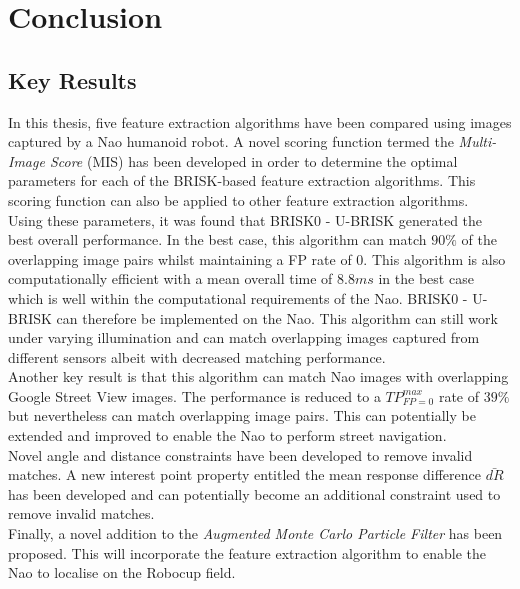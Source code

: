 \chapter{Conclusion}
\label{sec:Conclusion}



\section{Key Results}
\label{sec:keyResults}
In this thesis, five feature extraction algorithms have been compared using images captured by a Nao humanoid robot. A novel scoring function termed the \textit{Multi-Image Score} (MIS) has been developed in order to determine the optimal parameters for each  of the BRISK-based feature extraction algorithms. This scoring function can also be applied to other feature extraction algorithms.\\

Using these parameters, it was found that BRISK0 - U-BRISK generated the best overall performance. In the best case, this algorithm can match $90\%$ of the overlapping image pairs whilst maintaining a FP rate of $0$. This algorithm is also computationally efficient with a mean overall time of $8.8 ms$ in the best case which is well within the computational requirements of the Nao. BRISK0 - U-BRISK can therefore be implemented on the Nao. This algorithm can still work under varying illumination and can match overlapping images captured from different sensors albeit with decreased matching performance.\\

Another key result is that this algorithm can match Nao images with overlapping Google Street View images. The performance is reduced to a $TP_{FP=0}^{max}$ rate of $39\%$ but nevertheless can match overlapping image pairs. This can potentially be extended and improved to enable the Nao to perform street navigation.\\

Novel angle and distance constraints have been developed to remove invalid matches. A new interest point property entitled the mean response difference $\bar{dR}$ has been developed and can potentially become an additional constraint used to remove invalid matches.\\

Finally, a novel addition to the \textit{Augmented Monte Carlo Particle Filter} has been proposed. This will incorporate the feature extraction algorithm to enable the Nao to localise on the Robocup field.\\



